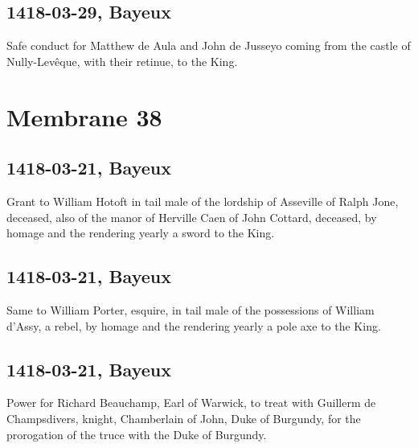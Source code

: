 \documentclass[a4paper,12pt,twoside]{book}
\begin{document}
                
                \subsection{1418-03-29, Bayeux}
                
                
                     Safe conduct for Matthew de Aula and John de Jusseyo coming from the castle of Nully-Levêque, with their retinue, to the King.
                  
                \newpage
            
            
            \section{Membrane 38}
            
            
                
                \subsection{1418-03-21, Bayeux}
                
                
                  Grant to William Hotoft in tail male of the lordship of Asseville of Ralph Jone, deceased, also of the manor of Herville Caen of John Cottard, deceased, by homage and the rendering yearly a sword to the King.
               
                
                \subsection{1418-03-21, Bayeux}
                
                
                  Same to William Porter, esquire, in tail male of the possessions of William d'Assy, a rebel, by homage and the rendering yearly a pole axe to the King.
               
                
                \subsection{1418-03-21, Bayeux}
                
                
                  Power for Richard Beauchamp, Earl of Warwick, to treat with Guillerm de Champsdivers, knight, Chamberlain of John, Duke of Burgundy, for the prorogation of the truce with the Duke of Burgundy.
               
\end{document}
